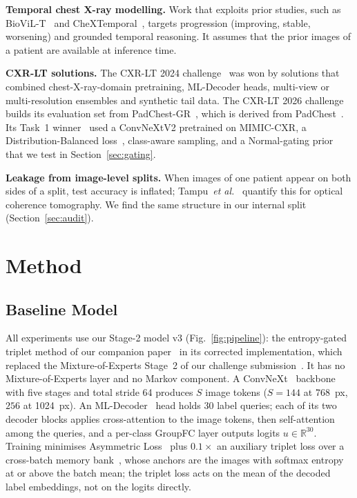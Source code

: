 \documentclass[conference]{IEEEtran}
\begin{document}
\textbf{Temporal chest X-ray modelling.} Work that exploits prior studies, such as BioViL-T~\cite{b20} and CheXTemporal~\cite{b21}, targets progression (improving, stable, worsening) and grounded temporal reasoning. It assumes that the prior images of a patient are available at inference time.

\textbf{CXR-LT solutions.} The CXR-LT 2024 challenge~\cite{b16} was won by solutions that combined chest-X-ray-domain pretraining, ML-Decoder heads, multi-view or multi-resolution ensembles and synthetic tail data. The CXR-LT 2026 challenge~\cite{b11,b14} builds its evaluation set from PadChest-GR~\cite{b10}, which is derived from PadChest~\cite{b9}. Its Task~1 winner~\cite{b15} used a ConvNeXtV2 pretrained on MIMIC-CXR, a Distribution-Balanced loss~\cite{b23}, class-aware sampling, and a Normal-gating prior that we test in Section~\ref{sec:gating}.

\textbf{Leakage from image-level splits.} When images of one patient appear on both sides of a split, test accuracy is inflated; Tampu~\textit{et al.}~\cite{b22} quantify this for optical coherence tomography. We find the same structure in our internal split (Section~\ref{sec:audit}).

\section{Method}

\subsection{Baseline Model}
All experiments use our Stage-2 model v3 (Fig.~\ref{fig:pipeline}): the entropy-gated triplet method of our companion paper~\cite{b25} in its corrected implementation, which replaced the Mixture-of-Experts Stage~2 of our challenge submission~\cite{b12}. It has no Mixture-of-Experts layer and no Markov component. A ConvNeXt~\cite{b1} backbone with five stages and total stride 64 produces $S$ image tokens ($S{=}144$ at 768~px, $256$ at 1024~px). An ML-Decoder~\cite{b2} head holds 30 label queries; each of its two decoder blocks applies cross-attention to the image tokens, then self-attention among the queries, and a per-class GroupFC layer outputs logits $u \in \mathbb{R}^{30}$. Training minimises Asymmetric Loss~\cite{b3} plus $0.1\times$ an auxiliary triplet loss over a cross-batch memory bank~\cite{b6}, whose anchors are the images with softmax entropy at or above the batch mean; the triplet loss acts on the mean of the decoded label embeddings, not on the logits directly.
\end{document}
